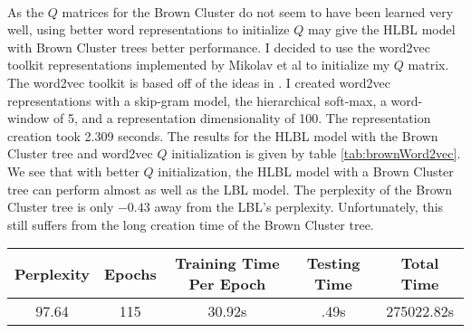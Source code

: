 \documentclass[12pt]{ociamthesis}  %
\newcommand{\ra}[1]{\renewcommand{\arraystretch}{#1}}
\begin{document}
\paragraph{}
As the $Q$ matrices for the Brown Cluster do not seem to have been learned very well, using better word representations to initialize $Q$ may give the HLBL model with Brown Cluster trees better performance. I decided to use the word2vec toolkit representations implemented by Mikolav et al to initialize my $Q$ matrix. The word2vec toolkit is based off of the ideas in \cite{Mikolov2013}. I created word2vec representations with a skip-gram model, the hierarchical soft-max, a word-window of 5, and a representation dimensionality of 100. The representation creation took 2.309 seconds. The results for the HLBL model with the Brown Cluster tree and word2vec $Q$ initialization is given by table \ref{tab:brownWord2vec}. We see that with better $Q$ initialization, the HLBL model with a Brown Cluster tree can perform almost as well as the LBL model. The perplexity of the Brown Cluster tree is only $-0.43$ away from the LBL's perplexity. Unfortunately, this still suffers from the long creation time of the Brown Cluster tree.

\begin{table*} \centering
\ra{1.3}
\begin{tabular}{ccccc}\toprule
Perplexity & Epochs & Training Time Per Epoch & Testing Time & Total Time\\ 
\midrule
97.64 & 115& 30.92s & .49s& 275022.82s\\
\bottomrule
\end{tabular}
\caption{HLBL model with Brown Cluster tree and Q initialized with word2vec representations on WSJ dataset}
\label{tab:brownWord2vec}
\end{table*}



\renewcommand{\bibname}{References}
\end{document}
